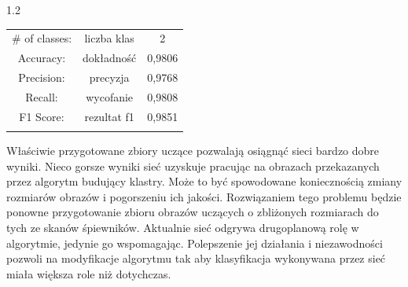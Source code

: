 \documentclass[a4paper,12pt]{article}
\newcommand\spacingInSolemnItemize{1.2}
\begin{document}
                
		    
            \begin{spacing}{\spacingInSolemnItemize}
		    \begin{center}
                \begin{tabular}{c c c }
                    \# of classes: & liczba klas & 2 \\
                    Accuracy:  & dokładność &0,9806  \\ 
                    Precision:  & precyzja & 0,9768 \\  
                    Recall: & wycofanie & 0,9808      \\
                    F1 Score: & rezultat f1 & 0,9851 \\
                     &  & 
                \end{tabular}
            \end{center}
		    \end{spacing}
		    
		    Właściwie przygotowane zbiory uczące pozwalają osiągnąć sieci bardzo dobre wyniki. Nieco gorsze wyniki sieć uzyskuje pracując na obrazach przekazanych przez algorytm budujący klastry. Może to być spowodowane koniecznością zmiany rozmiarów obrazów i pogorszeniu ich jakości. Rozwiązaniem tego problemu będzie ponowne przygotowanie zbioru obrazów uczących o zbliżonych rozmiarach do tych ze skanów śpiewników. Aktualnie sieć odgrywa drugoplanową rolę w algorytmie, jedynie go wspomagając. Polepszenie jej działania i niezawodności pozwoli na modyfikacje algorytmu tak aby klasyfikacja wykonywana przez sieć miała większa role niż dotychczas.
		    
            
\end{document}
